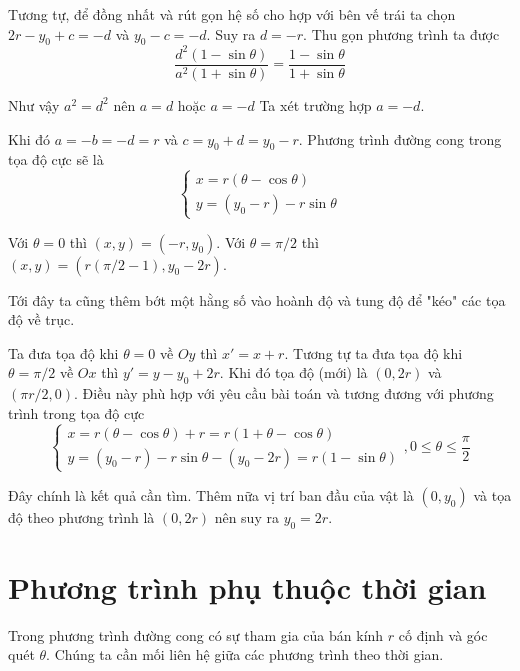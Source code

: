 \documentclass{mynotes}
\begin{document}
Tương tự, để đồng nhất và rút gọn hệ số cho hợp với bên vế trái ta chọn $2r - y_0 + c = -d$ và $y_0 - c = -d$. Suy ra $d = -r$. Thu gọn phương trình ta được
\begin{equation*}
    \frac{d^2 (1 - \sin\theta)}{a^2 (1 + \sin\theta)} = \frac{1 - \sin\theta}{1 + \sin\theta}
\end{equation*}

Như vậy $a^2 = d^2$ nên $a = d$ hoặc $a = -d$ Ta xét trường hợp $a = -d$.

Khi đó $a = -b = -d = r$ và $c = y_0 + d = y_0 - r$. Phương trình đường cong trong tọa độ cực sẽ là 
\begin{equation*}
    \begin{cases}
        x = r (\theta - \cos\theta) \\
        y = (y_0 - r) - r \sin\theta
    \end{cases}
\end{equation*}

Với $\theta = 0$ thì $(x, y) = (-r, y_0)$. Với $\theta = \pi / 2$ thì $(x, y) = (r (\pi / 2 - 1), y_0 - 2r)$.

Tới đây ta cũng thêm bớt một hằng số vào hoành độ và tung độ để "kéo" các tọa độ về trục.

Ta đưa tọa độ khi $\theta = 0$ về $Oy$ thì $x' = x + r$. Tương tự ta đưa tọa độ khi $\theta = \pi / 2$ về $Ox$ thì $y' = y - y_0 + 2r$. Khi đó tọa độ (mới) là $(0, 2r)$ và $(\pi r / 2, 0)$. Điều này phù hợp với yêu cầu bài toán và tương đương với phương trình trong tọa độ cực 
\begin{equation}
    \begin{cases}
        x = r (\theta - \cos\theta) + r = r (1 + \theta - \cos\theta) \\
        y = (y_0 - r) - r \sin\theta - (y_0 - 2r) = r (1 - \sin\theta)
    \end{cases}, 0 \leqslant \theta \leqslant \frac{\pi}{2}
\end{equation}

Đây chính là kết quả cần tìm. Thêm nữa vị trí ban đầu của vật là $(0, y_0)$ và tọa độ theo phương trình là $(0, 2r)$ nên suy ra $y_0 = 2r$.

\section*{Phương trình phụ thuộc thời gian}

Trong phương trình đường cong có sự tham gia của bán kính $r$ cố định và góc quét $\theta$. Chúng ta cần mối liên hệ giữa các phương trình theo thời gian.
\end{document}
